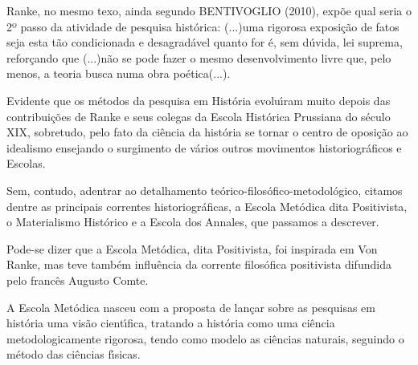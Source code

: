 \documentclass[
12pt,		%
openright,	%
twoside,  %
a4paper,			%
chapter=TITLE,		%
english,			%
french,				%
spanish,			%
brazil				%
]{USPSC-classe/USPSC}
\begin{document}
Ranke, no mesmo texo, ainda segundo  BENTIVOGLIO (2010), exp\~oe qual seria o 2º passo da atividade de pesquisa hist\'orica: \textquotedbl (...)uma rigorosa exposi\c{c}\~ao de fatos seja esta t\~ao condicionada e desagrad\'avel quanto for \'e, sem d\'uvida, lei suprema\textquotedbl , refor\c{c}ando que \textquotedbl (...)n\~ao se pode fazer o mesmo desenvolvimento livre que, pelo menos, a teoria busca numa obra po\'etica(...)\textquotedbl .














Evidente que os m\'etodos da pesquisa em Hist\'oria evolu\'{\i}ram muito depois das contribui\c{c}\~oes de Ranke e seus colegas da Escola Hist\'orica Prussiana do s\'eculo XIX, sobretudo, pelo fato da ci\^encia  da hist\'oria se tornar o centro de oposi\c{c}\~ao ao idealismo ensejando o surgimento de v\'arios outros movimentos historiogr\'aficos e Escolas.














Sem, contudo, adentrar ao detalhamento te\'orico-filos\'ofico-metodol\'ogico, citamos dentre as principais correntes historiogr\'aficas, a Escola Met\'odica dita Positivista, o Materialismo Hist\'orico e a Escola dos Annales, que passamos a descrever.














Pode-se dizer que a Escola Met\'odica, dita Positivista, foi inspirada em Von Ranke, mas teve tamb\'em influ\^encia da corrente filos\'ofica positivista difundida pelo franc\^es Augusto Comte.














A Escola Met\'odica nasceu com a proposta de  lan\c{c}ar sobre as pesquisas em hist\'oria uma vis\~ao cient\'{\i}fica, tratando a hist\'oria como uma ci\^encia metodologicamente rigorosa, tendo como modelo as ci\^encias naturais, seguindo o m\'etodo das ci\^encias f\'{\i}sicas.
\end{document}
